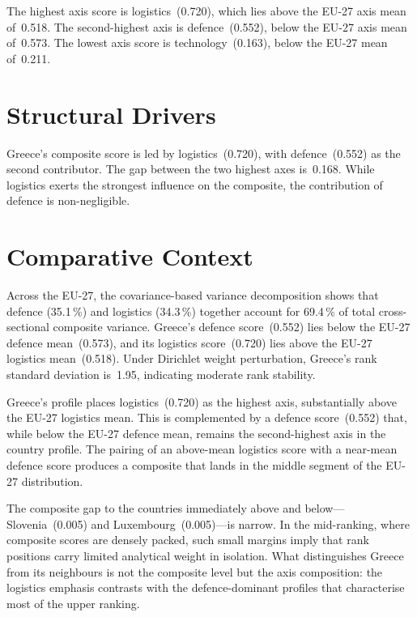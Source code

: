 \documentclass[12pt,a4paper]{article}
\begin{document}
The highest axis score is logistics~(0.720), which lies above the EU-27 axis mean of~0.518.  The second-highest axis is defence~(0.552), below the EU-27 axis mean of~0.573.  The lowest axis score is technology~(0.163), below the EU-27 mean of~0.211.


\section{Structural Drivers}
\label{sec:drivers}

\begin{sloppypar}
Greece's composite score is led by logistics~(0.720), with defence~(0.552) as the second contributor.  The gap between the two highest axes is~0.168.  While logistics exerts the strongest influence on the composite, the contribution of defence is non-negligible.
\end{sloppypar}


\section{Comparative Context}
\label{sec:comparative}

Across the EU-27, the covariance-based variance decomposition shows that defence (35.1\,\%) and logistics (34.3\,\%) together account for 69.4\,\% of total cross-sectional composite variance.  Greece's defence score~(0.552) lies below the EU-27 defence mean~(0.573), and its logistics score~(0.720) lies above the EU-27 logistics mean~(0.518).  Under Dirichlet weight perturbation, Greece's rank standard deviation is~1.95, indicating moderate rank stability.



Greece's profile places logistics~(0.720) as the highest axis, substantially above the EU-27 logistics mean.  This is complemented by a defence score~(0.552) that, while below the EU-27 defence mean, remains the second-highest axis in the country profile.  The pairing of an above-mean logistics score with a near-mean defence score produces a composite that lands in the middle segment of the EU-27 distribution.

The composite gap to the countries immediately above and below---Slovenia~(0.005) and Luxembourg~(0.005)---is narrow.  In the mid-ranking, where composite scores are densely packed, such small margins imply that rank positions carry limited analytical weight in isolation.  What distinguishes Greece from its neighbours is not the composite level but the axis composition: the logistics emphasis contrasts with the defence-dominant profiles that characterise most of the upper ranking.
\end{document}
